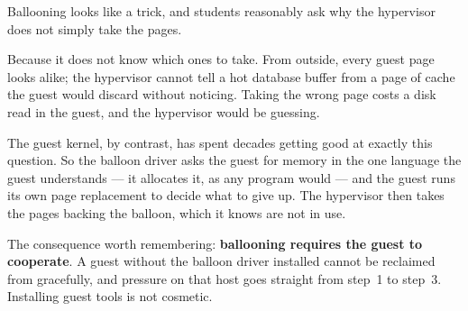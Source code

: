 \begin{conceptbox}
Ballooning looks like a trick, and students reasonably ask why the hypervisor
does not simply take the pages.

\smallskip
Because it does not know which ones to take. From outside, every guest page
looks alike; the hypervisor cannot tell a hot database buffer from a page of
cache the guest would discard without noticing. Taking the wrong page costs a
disk read in the guest, and the hypervisor would be guessing.

\smallskip
The guest kernel, by contrast, has spent decades getting good at exactly this
question. So the balloon driver asks the guest for memory in the one language
the guest understands --- it allocates it, as any program would --- and the
guest runs its own page replacement to decide what to give up. The hypervisor
then takes the pages backing the balloon, which it knows are not in use.

\smallskip
The consequence worth remembering: \textbf{ballooning requires the guest to
cooperate}. A guest without the balloon driver installed cannot be reclaimed
from gracefully, and pressure on that host goes straight from step~1 to
step~3. Installing guest tools is not cosmetic.
\end{conceptbox}

